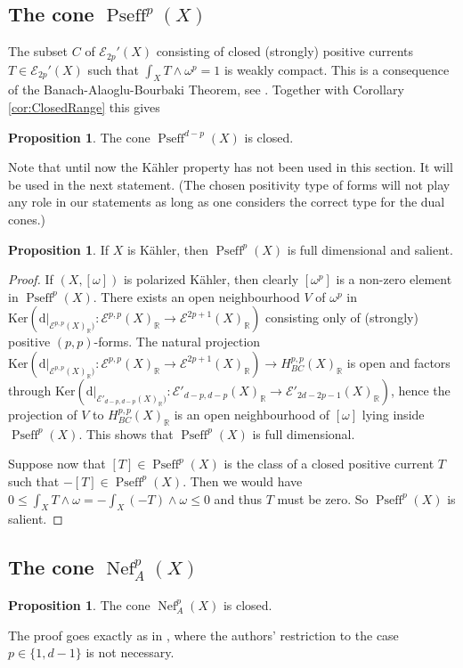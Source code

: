 \documentclass[a4,reqno]{amsart}
\theoremstyle{definition}
\newtheorem{proposition}[theorem]{Proposition}
\def\cE{\mathcal E}
\newcommand{\R}{\mathbb{R}}
\def\d{\mbox{d}}
\def\Ker{\mbox{Ker}}
\DeclareMathOperator{\Pseff}{Pseff}
\DeclareMathOperator{\Nef}{Nef}
\numberwithin{equation}{section}
\begin{document}
\subsection{The cone $\Pseff^p(X)$}

The subset $C$ of $\cE_{2p}'(X)$ consisting of closed (strongly) positive currents $T\in \cE_{2p}'(X)$ such that $\int_X T\wedge\omega^p=1$ is weakly compact. This is a consequence of the Banach-Alaoglu-Bourbaki Theorem, see 
\cite[Proposition III.1.23]{DemaillyBook}. Together with Corollary \ref{cor:ClosedRange} this gives

\begin{proposition}
The cone $\Pseff^{d-p}(X)$ is closed.
\end{proposition}

Note that until now the K\"ahler property has not been used in this section. 
It will be used in the next statement. (The chosen  positivity type of forms will not play any role in our statements as long as one considers the correct type for the dual cones.)

\begin{proposition}\label{prop:Pseff-full-dimensional}
If $X$ is K\"ahler, then  $\Pseff^{p}(X)$ is full dimensional and salient.
\end{proposition}

\begin{proof}
    If $(X,[\omega])$ is polarized K\"ahler, then clearly $[\omega^p]$ is a non-zero element in $\Pseff^{p}(X)$. There exists an open neighbourhood $V$ of $\omega^p$ in  $\Ker(\d|_{ \cE^{p,p}(X)_\R)}:\cE^{p,p}(X)_\R\to \cE^{2p+1}(X)_\R)$ consisting only of (strongly) positive $(p,p)$-forms. The natural projection $\Ker(\d|_{ \cE^{p,p}(X)_\R)}:\cE^{p,p}(X)_\R\to \cE^{2p+1}(X)_\R)\to H^{p,p}_{BC}(X)_\R$ is open and factors through $\Ker(\d|_{ \cE'_{d-p,d-p}(X)_\R)}:\cE'_{d-p,d-p}(X)_\R\to \cE'_{2d-2p-1}(X)_\R)$, hence the projection of $V$ to $H^{p,p}_{BC}(X)_\R$ is an open neighbourhood of $[\omega]$ lying inside $\Pseff^{p}(X)$. This shows that $\Pseff^{p}(X)$ is full dimensional.

    Suppose now that $[T]\in \Pseff^{p}(X)$ is the class of a closed positive current $T$ such that $-[T]\in\Pseff^{p}(X)$. Then we would have $0\le\int_XT\wedge\omega=-\int_X(-T)\wedge\omega\le0$ and thus $T$ must be zero. So $\Pseff^{p}(X)$ is salient. 
\end{proof}

\subsection{The cone $\Nef_A^p(X)$}
\begin{proposition}
    The cone $\Nef_A^p(X)$ is closed.
\end{proposition}
The proof goes exactly as in \cite[Lemma 2.3]{ChioseRasdeaconuSuvaina2019}, where the authors' restriction to the case $p\in\{1,d-1\}$ is not necessary.
\end{document}
